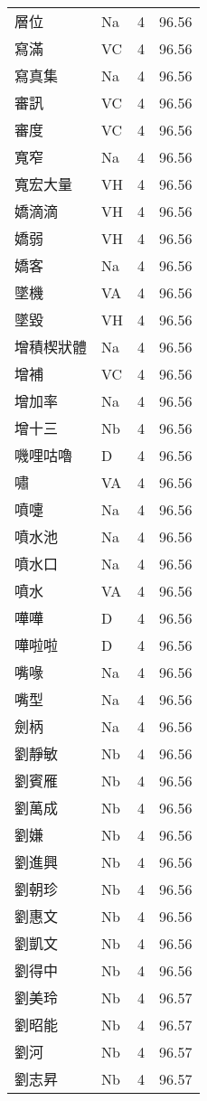 \documentclass[twocolumn]{book}
\begin{document}
\begin{supertabular}{llrr}
層位 & Na & 4 &  96.56\\
寫滿 & VC & 4 &  96.56\\
寫真集 & Na & 4 &  96.56\\
審訊 & VC & 4 &  96.56\\
審度 & VC & 4 &  96.56\\
寬窄 & Na & 4 &  96.56\\
寬宏大量 & VH & 4 &  96.56\\
嬌滴滴 & VH & 4 &  96.56\\
嬌弱 & VH & 4 &  96.56\\
嬌客 & Na & 4 &  96.56\\
墜機 & VA & 4 &  96.56\\
墜毀 & VH & 4 &  96.56\\
增積楔狀體 & Na & 4 &  96.56\\
增補 & VC & 4 &  96.56\\
增加率 & Na & 4 &  96.56\\
增十三 & Nb & 4 &  96.56\\
嘰哩咕嚕 & D & 4 &  96.56\\
嘯 & VA & 4 &  96.56\\
噴嚏 & Na & 4 &  96.56\\
噴水池 & Na & 4 &  96.56\\
噴水口 & Na & 4 &  96.56\\
噴水 & VA & 4 &  96.56\\
嘩嘩 & D & 4 &  96.56\\
嘩啦啦 & D & 4 &  96.56\\
嘴喙 & Na & 4 &  96.56\\
嘴型 & Na & 4 &  96.56\\
劍柄 & Na & 4 &  96.56\\
劉靜敏 & Nb & 4 &  96.56\\
劉賓雁 & Nb & 4 &  96.56\\
劉萬成 & Nb & 4 &  96.56\\
劉嫌 & Nb & 4 &  96.56\\
劉進興 & Nb & 4 &  96.56\\
劉朝珍 & Nb & 4 &  96.56\\
劉惠文 & Nb & 4 &  96.56\\
劉凱文 & Nb & 4 &  96.56\\
劉得中 & Nb & 4 &  96.56\\
劉美玲 & Nb & 4 &  96.57\\
劉昭能 & Nb & 4 &  96.57\\
劉河 & Nb & 4 &  96.57\\
劉志昇 & Nb & 4 &  96.57\\

\end{supertabular}
\end{document}
